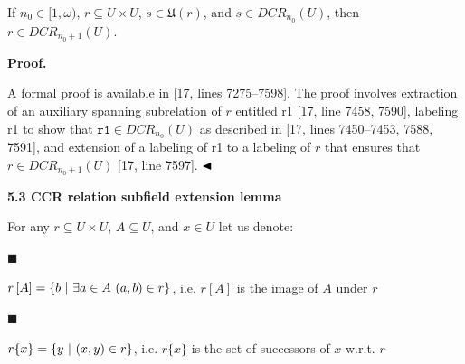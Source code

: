 \documentclass[10pt,a4paper]{amsart}
\begin{document}
 
If $n_{0}\in[1,\omega)$, $r\subseteq U\times U$, $s\in\mathfrak{U}(r)$, and $s\in DCR_{n_{0}}(U)$, then $r\in DCR_{n_{0}+1}(U)$.\par
 
 
 
 
\par\medskip\noindent\textbf{Proof.}\par
 
 
A formal proof is available in [17, lines 7275–7598]. The proof involves extraction of an auxiliary spanning subrelation of $r$ entitled r1 [17, line 7458, 7590], labeling r1 to show that $\texttt{r1}\in DCR_{n_{0}}(U)$ as described in [17, lines 7450–7453, 7588, 7591], and extension of a labeling of r1 to a labeling of $r$ that ensures that $r\in DCR_{n_{0}+1}(U)$ [17, line 7597]. $\hfill\blacktriangleleft$\par
 
 
 
 
 
\par\medskip\noindent\textbf{5.3 CCR relation subfield extension lemma}\par
 
 
For any $r\subseteq U\times U$, $A\subseteq U$, and $x\in U$ let us denote:\par
  
\par\noindent  $\blacksquare$ 
 
$r\left[A\right]=\{b\leavevmode\nobreak\ |\leavevmode\nobreak\ \exists a\in A%
\leavevmode\nobreak\ (a,b)\in r\}$, i.e. $r\left[A\right]$ is the image of $A$ under $r$\par
 
 
 
\par\noindent  $\blacksquare$ 
 
$r\{x\}=\{y\leavevmode\nobreak\ |\leavevmode\nobreak\ (x,y)\in r\}$, i.e. $r\{x\}$ is the set of successors of $x$ w.r.t. $r$\par
 
\end{document}
